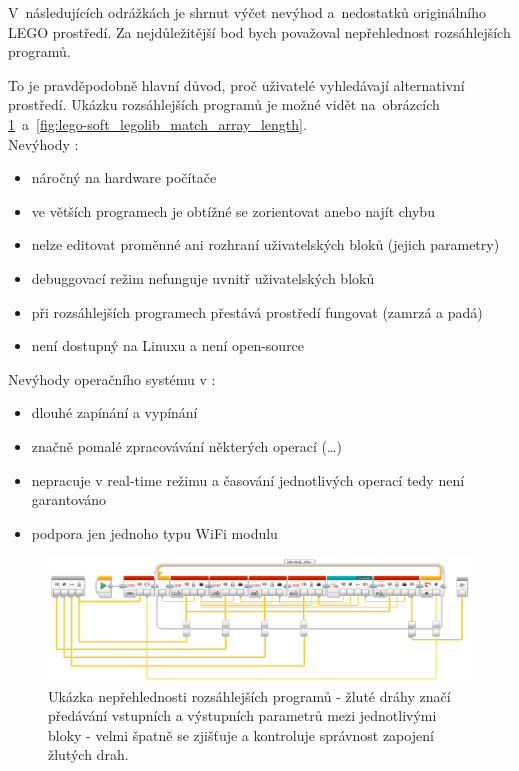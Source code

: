 V~následujících odrážkách je shrnut výčet nevýhod a~nedostatků originálního LEGO prostředí. 
Za nejdůležitější bod bych považoval nepřehlednost rozsáhlejších programů. %


To je pravděpodobně hlavní důvod, proč uživatelé \legoM{} vyhledávají alternativní prostředí. 
Ukázku rozsáhlejších programů je možné vidět na~obrázcích \ref{fig:lego-soft_legolib_converge_array}~a~\ref{fig:lego-soft_legolib_match_array_length}.\\

Nevýhody \legoSW:

\renewcommand{\labelitemi}{$-$} %
\begin{itemize}[noitemsep]\itemsep2pt
	\item náročný na hardware počítače
	\item ve větších programech je obtížné se zorientovat anebo najít chybu
	\item nelze editovat proměnné ani rozhraní uživatelských bloků (jejich parametry)
	\item debuggovací režim nefunguje uvnitř uživatelských bloků
	\item při rozsáhlejších programech přestává prostředí fungovat (zamrzá a padá)
	\item není dostupný na Linuxu a není open-source
\end{itemize}

Nevýhody operačního systému v :
\begin{itemize}[noitemsep]\itemsep2pt
	\item dlouhé zapínání a vypínání
	\item značně pomalé zpracovávání některých operací (\dots) %
	\item nepracuje v real-time režimu a časování jednotlivých operací tedy není garantováno
	\item podpora jen jednoho typu WiFi modulu
\end{itemize}
\renewcommand{\labelitemi}{$\bullet$} %

\begin{figure}[h]
	\centering
	\includegraphics[width=\textwidth]{images/lego-soft_legolib_converge_array.png}
	\caption[Ukázka nepřehlednosti rozsáhlejších programů]{Ukázka nepřehlednosti rozsáhlejších programů - žluté dráhy značí předávání vstupních a výstupních parametrů mezi jednotlivými bloky - velmi špatně se zjišťuje a kontroluje správnost zapojení žlutých drah.}
	\label{fig:lego-soft_legolib_converge_array}
\end{figure}
 
